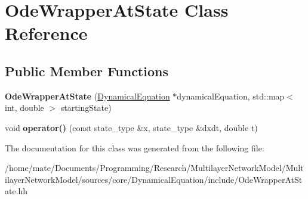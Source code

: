\hypertarget{classOdeWrapperAtState}{}\section{Ode\+Wrapper\+At\+State Class Reference}
\label{classOdeWrapperAtState}
\subsection*{Public Member Functions}
\begin{DoxyCompactItemize}
\item 
{\bfseries Ode\+Wrapper\+At\+State} (\hyperlink{classDynamicalEquation}{Dynamical\+Equation} $\ast$dynamical\+Equation, std\+::map$<$ int, double $>$ starting\+State)\hypertarget{classOdeWrapperAtState_a85955ed459f5e5a374aac006ce555f41}{}\label{classOdeWrapperAtState_a85955ed459f5e5a374aac006ce555f41}

\item 
void {\bfseries operator()} (const state\+\_\+type \&x, state\+\_\+type \&dxdt, double t)\hypertarget{classOdeWrapperAtState_accd0221f4e8c7f809ef83693d6e7db05}{}\label{classOdeWrapperAtState_accd0221f4e8c7f809ef83693d6e7db05}

\end{DoxyCompactItemize}


The documentation for this class was generated from the following file\+:\begin{DoxyCompactItemize}
\item 
/home/mate/\+Documents/\+Programming/\+Research/\+Multilayer\+Network\+Model/\+Multilayer\+Network\+Model/sources/core/\+Dynamical\+Equation/include/Ode\+Wrapper\+At\+State.\+hh\end{DoxyCompactItemize}
